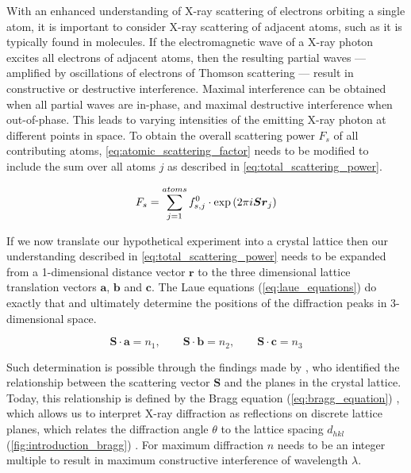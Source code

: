 With an enhanced understanding of X-ray scattering of electrons orbiting a single atom, it is important to consider X-ray scattering of adjacent atoms, such as it is typically found in molecules. If the electromagnetic wave of a X-ray photon excites all electrons of adjacent atoms, then the resulting partial waves --- amplified by oscillations of electrons of Thomson scattering --- result in constructive or destructive interference. Maximal interference can be obtained when all partial waves are in-phase, and maximal destructive interference when out-of-phase. This leads to varying intensities of the emitting X-ray photon at different points in space. To obtain the overall scattering power $F_s$ of all contributing atoms, \cref{eq:atomic_scattering_factor} needs to be modified to include the sum over all atoms $j$ as described in \cref{eq:total_scattering_power}.

\begin{equation}
    F_s=\sum_{j=1}^{atoms}f_{s,j}^0 \cdot \exp\left(2\pi\\i\boldsymbol{S}\boldsymbol{r}_j\right)
    \label{eq:total_scattering_power}
\end{equation}

If we now translate our hypothetical experiment into a crystal lattice then our understanding described in \cref{eq:total_scattering_power} needs to be expanded from a 1-dimensional distance vector $\boldsymbol{r}$ to the three dimensional lattice translation vectors $\boldsymbol{a}$, $\boldsymbol{b}$ and $\boldsymbol{c}$. The Laue equations (\cref{eq:laue_equations}) do exactly that and ultimately determine the positions of the diffraction peaks in 3-dimensional space.

\begin{equation}
    \boldsymbol{S} \cdot \boldsymbol{a}=n_1, \quad \quad \boldsymbol{S} \cdot \boldsymbol{b}=n_2, \quad \quad \boldsymbol{S} \cdot \boldsymbol{c}=n_3
    \label{eq:laue_equations}
\end{equation}

Such determination is possible through the findings made by \textcite{Bragg1913-cx}, who identified the relationship between the scattering vector $\boldsymbol{S}$ and the planes in the crystal lattice. Today, this relationship is defined by the Bragg equation (\cref{eq:bragg_equation}) \cite{Bragg1913-cx}, which allows us to interpret X-ray diffraction as reflections on discrete lattice planes, which relates the diffraction angle $\theta$ to the lattice spacing $d_{hkl}$ (\cref{fig:introduction_bragg}) \cite{Rupp2010-nc}. For maximum diffraction $n$ needs to be an integer multiple to result in maximum constructive interference of wavelength $\lambda$.

